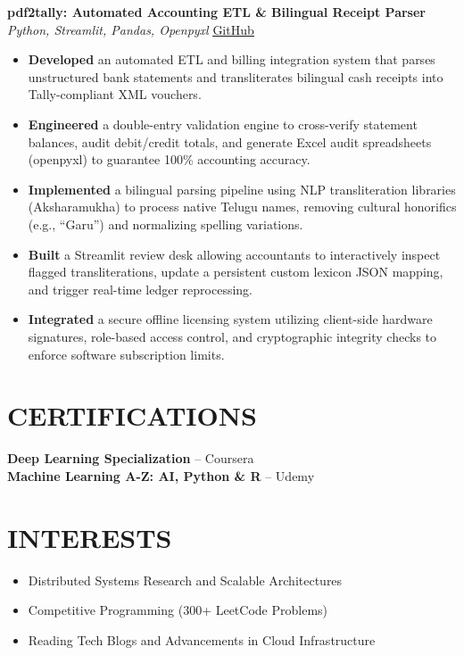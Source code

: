 \documentclass[letterpaper,10pt]{article}
\begin{document}
\vspace{4pt}

\textbf{pdf2tally: Automated Accounting ETL \& Bilingual Receipt Parser} \textbar{} \textit{Python, Streamlit, Pandas, Openpyxl} \textbar{} \href{https://github.com/Venukumar975/pdf2tally}{\underline{GitHub}}
\begin{itemize}[leftmargin=*,noitemsep,topsep=2pt,parsep=0pt,partopsep=0pt]
    \item \textbf{Developed} an automated ETL and billing integration system that parses unstructured bank statements and transliterates bilingual cash receipts into Tally-compliant XML vouchers.
    \item \textbf{Engineered} a double-entry validation engine to cross-verify statement balances, audit debit/credit totals, and generate Excel audit spreadsheets (openpyxl) to guarantee 100\% accounting accuracy.
    \item \textbf{Implemented} a bilingual parsing pipeline using NLP transliteration libraries (Aksharamukha) to process native Telugu names, removing cultural honorifics (e.g., ``Garu'') and normalizing spelling variations.
    \item \textbf{Built} a Streamlit review desk allowing accountants to interactively inspect flagged transliterations, update a persistent custom lexicon JSON mapping, and trigger real-time ledger reprocessing.
    \item \textbf{Integrated} a secure offline licensing system utilizing client-side hardware signatures, role-based access control, and cryptographic integrity checks to enforce software subscription limits.
\end{itemize}

\vspace{-4pt}

\section*{CERTIFICATIONS}
\vspace{2pt}
\textbf{Deep Learning Specialization} -- Coursera \\
\textbf{Machine Learning A-Z: AI, Python \& R} -- Udemy

\section*{INTERESTS}
\begin{itemize}[leftmargin=*,noitemsep,topsep=2pt,parsep=0pt,partopsep=0pt]
    \item Distributed Systems Research and Scalable Architectures
    \item Competitive Programming (300+ LeetCode Problems)
    \item Reading Tech Blogs and Advancements in Cloud Infrastructure
\end{itemize}
\end{document}
